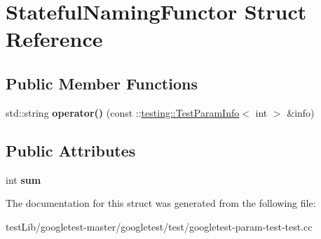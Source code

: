\hypertarget{structStatefulNamingFunctor}{}\section{Stateful\+Naming\+Functor Struct Reference}
\label{structStatefulNamingFunctor}
\subsection*{Public Member Functions}
\begin{DoxyCompactItemize}
\item 
\mbox{\label{structStatefulNamingFunctor_a6a1d07c0b8314c1aee535f269ea536db}} 
std\+::string {\bfseries operator()} (const \+::\hyperlink{structtesting_1_1TestParamInfo}{testing\+::\+Test\+Param\+Info}$<$ int $>$ \&info)
\end{DoxyCompactItemize}
\subsection*{Public Attributes}
\begin{DoxyCompactItemize}
\item 
\mbox{\label{structStatefulNamingFunctor_a95887cf031d3113ae2edcd7617af3b79}} 
int {\bfseries sum}
\end{DoxyCompactItemize}


The documentation for this struct was generated from the following file\+:\begin{DoxyCompactItemize}
\item 
test\+Lib/googletest-\/master/googletest/test/googletest-\/param-\/test-\/test.\+cc\end{DoxyCompactItemize}
